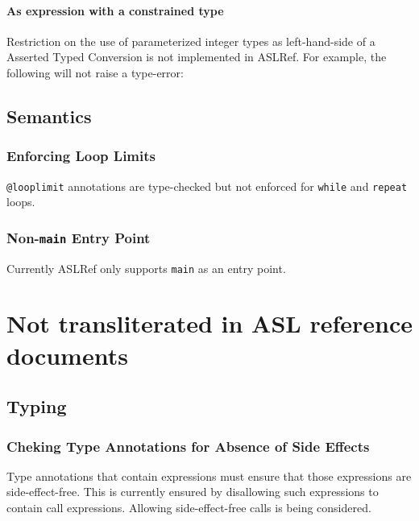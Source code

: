 \documentclass{book}
\begin{document}
\subsubsection{As expression with a constrained type}

Restriction on the use of parameterized integer types as left-hand-side of a
Asserted Typed Conversion is not implemented in ASLRef.
%
For example, the following will not raise a type-error:


\section{Semantics}

\subsection{Enforcing Loop Limits}
\verb|@looplimit| annotations are type-checked but not enforced for \texttt{while} and \texttt{repeat} loops.

\subsection{Non-\texttt{main} Entry Point}
Currently ASLRef only supports \texttt{main} as an entry point.

\chapter{Not transliterated in ASL reference documents}

\section{Typing}

\subsection{Cheking Type Annotations for Absence of Side Effects}
Type annotations that contain expressions must ensure that those expressions are side-effect-free.
This is currently ensured by disallowing such expressions to contain call expressions.
Allowing side-effect-free calls is being considered.
\end{document}
